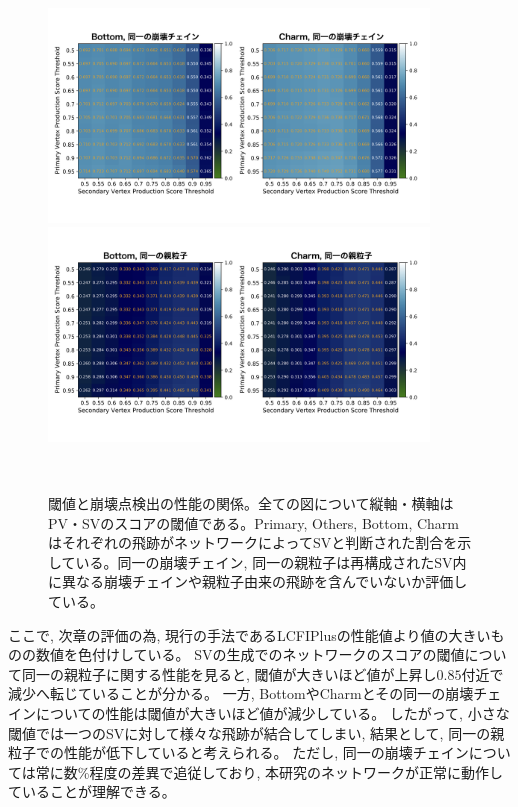 \begin{figure}[htbp]
   \begin{minipage}{0.95\textwidth}
   \centering
    \includegraphics[trim = 0 140 0 125, width=0.9\textwidth, clip]{Figure/4VertexFinderwithDL/4-2-2-2SameDecayChain.png}
   \end{minipage}
   
   \begin{minipage}{0.95\textwidth}
   \centering
    \includegraphics[trim = 0 140 0 125, width=0.9\textwidth, clip]{Figure/4VertexFinderwithDL/4-2-2-2SameParentParticle.png}
   \end{minipage} 
  \caption[閾値と崩壊点検出の性能の関係]{閾値と崩壊点検出の性能の関係。全ての図について縦軸・横軸はPV・SVのスコアの閾値である。Primary, Others, Bottom, Charmはそれぞれの飛跡がネットワークによってSVと判断された割合を示している。同一の崩壊チェイン, 同一の親粒子は再構成されたSV内に異なる崩壊チェインや親粒子由来の飛跡を含んでいないか評価している。}
  \label{4-2-2-2TrackEfficiency}
\end{figure}

ここで, 次章の評価の為, 現行の手法であるLCFIPlusの性能値より値の大きいものの数値を色付けしている。
SVの生成でのネットワークのスコアの閾値について同一の親粒子に関する性能を見ると, 閾値が大きいほど値が上昇し$0.85$付近で減少へ転じていることが分かる。
一方, BottomやCharmとその同一の崩壊チェインについての性能は閾値が大きいほど値が減少している。
したがって, 小さな閾値では一つのSVに対して様々な飛跡が結合してしまい, 結果として, 同一の親粒子での性能が低下していると考えられる。
ただし, 同一の崩壊チェインについては常に数\%程度の差異で追従しており, 本研究のネットワークが正常に動作していることが理解できる。

